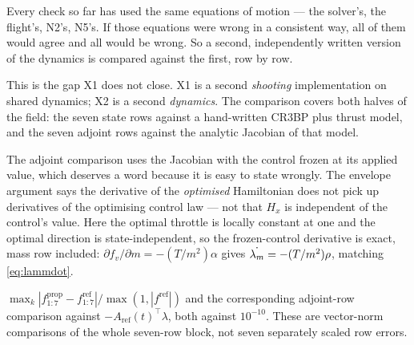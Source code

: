 \documentclass[11pt]{article}
\begin{document}
\begin{eli}
Every check so far has used the same equations of motion --- the solver's, the
flight's, N2's, N5's. If those equations were wrong in a consistent way, all of
them would agree and all would be wrong. So a second, independently written
version of the dynamics is compared against the first, row by row.
\end{eli}

\begin{intu}
This is the gap X1 does not close. X1 is a second \emph{shooting} implementation
on shared dynamics; X2 is a second \emph{dynamics}. The comparison covers both
halves of the field: the seven state rows against a hand-written CR3BP plus
thrust model, and the seven adjoint rows against the analytic Jacobian of that
model.

The adjoint comparison uses the Jacobian with the control frozen at its applied
value, which deserves a word because it is easy to state wrongly. The envelope
argument says the derivative of the \emph{optimised} Hamiltonian does not pick
up derivatives of the optimising control law --- not that $H_x$ is independent
of the control's value. Here the optimal throttle is locally constant at one
and the optimal direction is state-independent, so the frozen-control
derivative is exact, mass row included:
$\partial f_v/\partial m = -(T/m^2)\alpha$ gives
$\dot{\lambda_m} = -(T/m^2)\rho$, matching \eqref{eq:lammdot}.
\end{intu}

\begin{rig}
$\max_k |f^{\text{prop}}_{1:7} - f^{\text{ref}}_{1:7}| / \max(1, |f^{\text{ref}}|)$
and the corresponding adjoint-row comparison against
$-A_{\text{ref}}(t)^\top \lambda$, both against $10^{-10}$. These are
vector-norm comparisons of the whole seven-row block, not seven separately
scaled row errors.
\end{rig}
\end{document}

